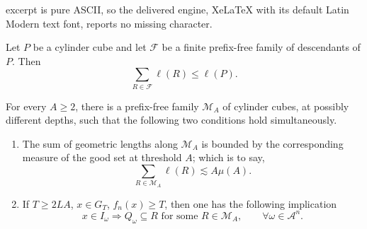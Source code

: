 \documentclass[10pt,a4paper]{amsart}
\begin{document}
excerpt is pure ASCII, so the delivered engine, XeLaTeX with its default Latin Modern text font, reports no missing character.
\begin{lemma}\label{lma:prefixfreepacking}
Let $P$ be a cylinder cube and let $\mathscr F$ be a finite prefix-free family of descendants of $P$. Then
\begin{equation}\label{eq:prefixfreepacking}
\sum_{R\in\mathscr F}\ell(R)\leq\ell(P).
\end{equation}
\end{lemma}

\begin{lemma}\label{lem:marked-packing}
For every $A\geq2$, there is a prefix-free family $\mathscr M_A$ of cylinder cubes, at possibly different depths, such that the following two conditions hold simultaneously.
\begin{enumerate}
\item The sum of geometric lengths along $\mathscr M_A$ is bounded by the corresponding measure of the good set at threshold $A$; which is to say,
\begin{equation}\label{eq:marked-packing}
\sum_{R\in\mathscr M_A}\ell(R)\lesssim A\mu(A).
\end{equation}
\item If $T\geq2LA$, $x\in G_T$, $f_n(x)\geq T$, then one has the following implication
\begin{equation}\label{eq:marked-packing-2}
x \in I_{\omega} \Longrightarrow Q_{\omega}\subseteq R
\text{ for some }R\in\mathscr{M}_A, \qquad \forall \omega \in \mathcal{A}^n.
\end{equation}
\end{enumerate}


\end{lemma}
\end{document}
